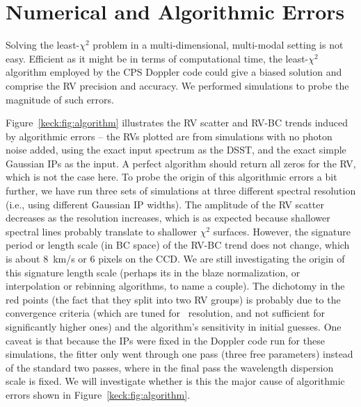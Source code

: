 


\section{Numerical and Algorithmic Errors}\label{keck:sec:algorithm}

Solving the least-$\chi^2$ problem in a multi-dimensional, multi-modal
setting is not easy. Efficient as it might be in terms of
computational time, the least-$\chi^2$ algorithm employed by the CPS
Doppler code could give a biased solution and comprise the RV precision
and accuracy. We performed simulations to probe the magnitude of such
errors.

Figure~\ref{keck:fig:algorithm} illustrates the RV scatter and RV-BC
trends induced by algorithmic errors -- the RVs plotted are from
simulations with no photon noise added, using the exact input spectrum
as the DSST, and the exact simple Gaussian IPs as the input. A perfect
algorithm should return all zeros for the RV, which is not the case
here. To probe the origin of this algorithmic errors a bit further, we
have run three sets of simulations at three different spectral
resolution (i.e., using different Gaussian IP widths). The amplitude
of the RV scatter decreases as the resolution increases, which is as
expected because shallower spectral lines probably translate to
shallower $\chi^2$ surfaces. However, the signature period or
length scale (in BC space) of the RV-BC trend does not change, which
is about 8~km/s or 6 pixels on the CCD. We are still investigating the
origin of this signature length scale (perhaps its in the blaze
normalization, or interpolation or rebinning algorithms, to name a
couple). The dichotomy in the red points (the fact that they split
into two RV groups) is probably due to the convergence criteria (which
are tuned for \keck\ resolution, and not sufficient for significantly
higher ones) and the algorithm's sensitivity in initial guesses. One
caveat is that because the IPs were fixed in the Doppler code run for
these simulations, the fitter only went through one pass (three free
parameters) instead of the standard two passes, where in the final
pass the wavelength dispersion scale is fixed. We will investigate
whether is this the major cause of algorithmic errors shown in
Figure~\ref{keck:fig:algorithm}. 


